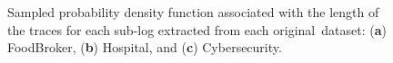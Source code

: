 \documentclass[information,article,accept,pdftex,oneauthor]{Definitions/mdpi}
\begin{document}
\begin{figure}[H]




\caption{{Sampled} %
 probability density function associated with the length of the traces for each sub-log extracted from each original~dataset: (\textbf{a}) FoodBroker, (\textbf{b}) Hospital,  and (\textbf{c}) Cybersecurity.}\label{fig:PDF}
\end{figure}
\end{document}
